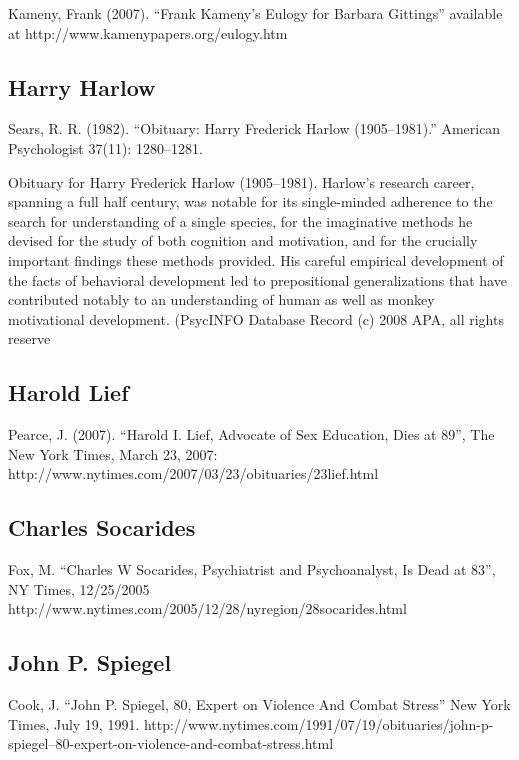 \begin{refsection}
\begin{appendices}
Kameny, Frank (2007). ``Frank Kameny's Eulogy for Barbara Gittings'' available at http:\slash \slash www.kamenypapers.org\slash eulogy.htm

\subsection{Harry Harlow}
\label{harryharlow}

Sears, R. R. (1982). ``Obituary: Harry Frederick Harlow (1905--1981).'' American Psychologist 37(11): 1280--1281. 

Obituary for Harry Frederick Harlow (1905--1981). Harlow's research career, spanning a full half century, was notable for its single-minded adherence to the search for understanding of a single species, for the imaginative methods he devised for the study of both cognition and motivation, and for the crucially important findings these methods provided. His careful empirical development of the facts of behavioral development led to prepositional generalizations that have contributed notably to an understanding of human as well as monkey motivational development. (PsycINFO Database Record (c) 2008 APA, all rights reserve 

\subsection{Harold Lief}
\label{haroldlief}

Pearce, J. (2007). ``Harold I. Lief, Advocate of Sex Education, Dies at 89'', The New York Times, March 23, 2007: http:\slash \slash www.nytimes.com\slash 2007\slash 03\slash 23\slash obituaries\slash 23lief.html 

\subsection{Charles Socarides}
\label{charlessocarides}

Fox, M. ``Charles W Socarides, Psychiatrist and Psychoanalyst, Is Dead at 83'', NY Times, 12\slash 25\slash 2005 http:\slash \slash www.nytimes.com\slash 2005\slash 12\slash 28\slash nyregion\slash 28socarides.html

\subsection{John P. Spiegel}
\label{johnp.spiegel}

Cook, J. ``John P. Spiegel, 80, Expert on Violence And Combat Stress'' New York Times, July 19, 1991. http:\slash \slash www.nytimes.com\slash 1991\slash 07\slash 19\slash obituaries\slash john-p-spiegel--80-expert-on-violence-and-combat-stress.html


\end{appendices}
\end{refsection}
